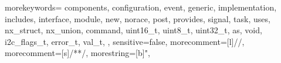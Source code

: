 \setlength{\parindent}{2em}
\renewcommand{\lstlistingname}{\wuhao 源码}
\renewcommand\thelstlisting{\arabic{chapter}-\arabic{lstlisting}}

\setlength{\headheight}{24pt}

\newfontfamily{}
\newfontfamily{}

 {
	morekeywords= {
		components, configuration, event, generic,
		implementation, includes, interface, module,
		new, norace, post, provides, signal, task,
		uses, nx\_struct, nx\_union, command,
		uint16\_t, uint8\_t, uint32\_t, as, void,
		i2c\_flags\_t, error\_t, val\_t,
	},
	sensitive=false,
	morecomment=[l]{//},
	morecomment=[s]{/*}{*/},
	morestring=[b]",
}


\renewcommand\arraystretch{1.25}


\renewcommand{\ALG@name}{算法}
\renewcommand\thealgorithm{\arabic{chapter}-\arabic{algorithm}}
\renewcommand{\algorithmicrequire}{\textbf{Input:}}
\renewcommand{\algorithmicensure}{\textbf{Output:}} 

